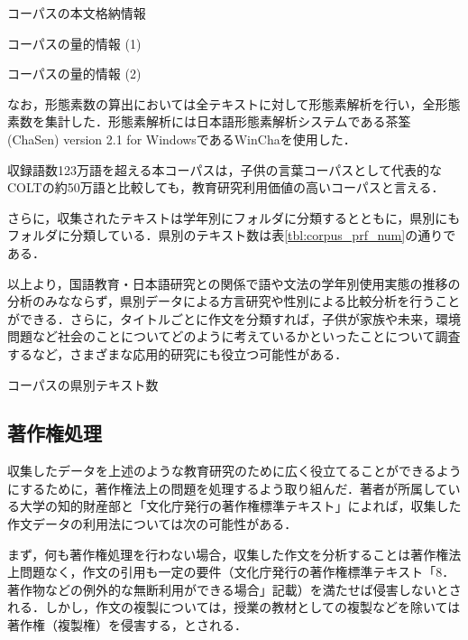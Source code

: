 \documentclass[japanese]{jnlp_1.4}
\begin{document}
\begin{table}[p]
\caption{コーパスの本文格納情報}
\label{tbl:corpus_form}

\end{table}
\begin{table}[p]
\caption{コーパスの量的情報 (1)}
\label{tbl:corpus_stats_1}

\end{table}
\begin{table}[p]
\caption{コーパスの量的情報 (2)}
\label{tbl:corpus_stats_2}

\end{table}

なお，形態素数の算出においては全テキストに対して形態素解析を行い，全形態素数を集計した．形態素解析には日本語形態素解析システムである茶筌 (ChaSen) version 2.1 for WindowsであるWinChaを使用した．

収録語数123万語を超える本コーパスは，子供の言葉コーパスとして代表的なCOLTの約50万語と比較しても，教育研究利用価値の高いコーパスと言える．

さらに，収集されたテキストは学年別にフォルダに分類するとともに，県別にもフォルダに分類している．県別のテキスト数は表\ref{tbl:corpus_prf_num}の通りである．

以上より，国語教育・日本語研究との関係で語や文法の学年別使用実態の推移の分析のみなならず，県別データによる方言研究や性別による比較分析を行うことができる．さらに，タイトルごとに作文を分類すれば，子供が家族や未来，環境問題など社会のことについてどのように考えているかといったことについて調査するなど，さまざまな応用的研究にも役立つ可能性がある．

\begin{table}[t]
\caption{コーパスの県別テキスト数}
\label{tbl:corpus_prf_num}

\end{table}



\subsection {著作権処理}

収集したデータを上述のような教育研究のために広く役立てることができるようにするために，著作権法上の問題を処理するよう取り組んだ．著者が所属している大学の知的財産部と「文化庁発行の著作権標準テキスト」によれば，収集した作文データの利用法については次の可能性がある．

まず，何も著作権処理を行わない場合，収集した作文を分析することは著作権法上問題なく，作文の引用も一定の要件（文化庁発行の著作権標準テキスト「8．著作物などの例外的な無断利用ができる場合」記載）を満たせば侵害しないとされる．しかし，作文の複製については，授業の教材としての複製などを除いては著作権（複製権）を侵害する，とされる．
\end{document}
